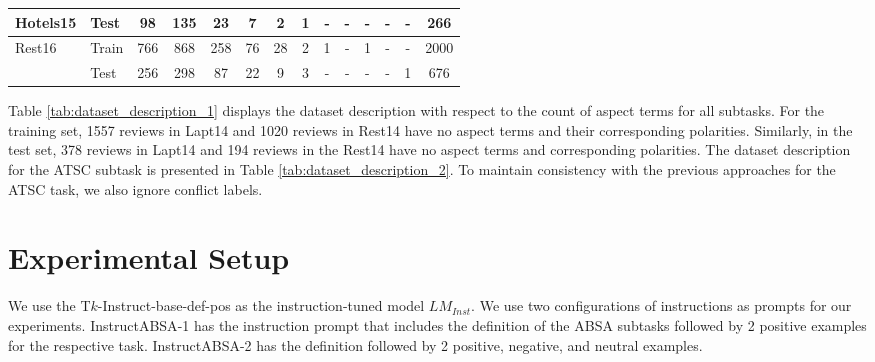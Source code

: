 \documentclass[11pt]{article}
\newcommand{\name}{\textsc{I}nstruct\textsc{ABSA}\xspace}
\begin{document}
\begin{table*}[]
{\begin{tabular}{l|l|c|c|c|c|c|c|c|c|c|c|c|c}
Hotels15 & Test  & 98                        & 135                       & 23                       & 7                        & 2                        & 1                        & -                         & -                         & -                         & -                         & -     & 266                         \\ \hline


Rest16 & Train & 766                & 868                      & 258                       & 76                       & 28                       & 2                        & 1                        & -                      & 1    & -    & -                         & 2000                        \\
    & Test  & 256                        & 298                       & 87                       & 22                        & 9                        & 3                        & -                         & -                         & -                         & -                         & 1     & 676                         \\ \hline

            
\end{tabular}
}
\caption{Count of Aspects for the ATE, ASTE, AOOE, AOPE and AOSTE subtasks. \#$k$ is the count of samples that have $k$ aspects/aspect-sentiment polarity pairs in them. \#NO is the number of samples that have no aspect/aspect-sentiment polarity pairs in them.}
\label{tab:dataset_description_1}
\end{table*} 
Table \ref{tab:dataset_description_1} displays the dataset description with respect to the count of aspect terms for all subtasks. 
For the training set, 1557 reviews in Lapt14 and 1020 reviews in Rest14 have no aspect terms and their corresponding polarities. 
Similarly, in the test set, 378 reviews in Lapt14 and 194 reviews in the Rest14 have no aspect terms and corresponding polarities. 
The dataset description for the ATSC subtask is presented in Table \ref{tab:dataset_description_2}. 
To maintain consistency with the previous approaches for the ATSC task, we also ignore conflict labels.

\section{Experimental Setup}
We use the T$k$-Instruct-base-def-pos as the instruction-tuned model $LM_{Inst}$.
We use two configurations of instructions as prompts for our experiments. 
\name{}-1 has the instruction prompt that includes the definition of the ABSA subtasks followed by 2 positive examples for the respective task.
\name{}-2 has the definition followed by 2 positive, negative, and neutral examples.
\end{document}
